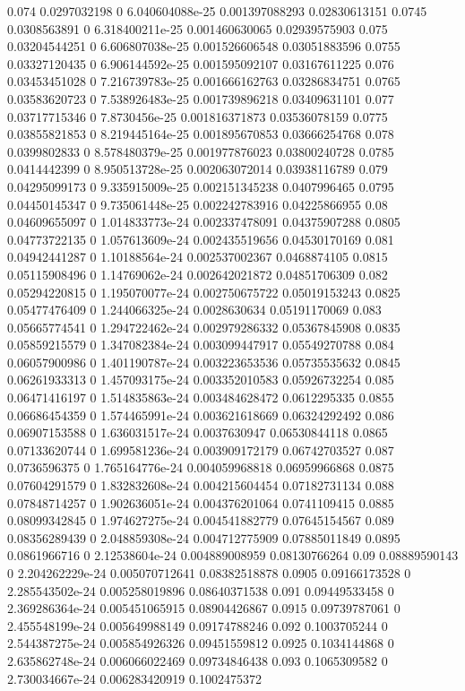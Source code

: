 {0.074 0.0297032198 0 6.040604088e-25 0.001397088293 0.02830613151
0.0745 0.0308563891 0 6.318400211e-25 0.001460630065 0.02939575903
0.075 0.03204544251 0 6.606807038e-25 0.001526606548 0.03051883596
0.0755 0.03327120435 0 6.906144592e-25 0.001595092107 0.03167611225
0.076 0.03453451028 0 7.216739783e-25 0.001666162763 0.03286834751
0.0765 0.03583620723 0 7.538926483e-25 0.001739896218 0.03409631101
0.077 0.03717715346 0 7.8730456e-25 0.001816371873 0.03536078159
0.0775 0.03855821853 0 8.219445164e-25 0.001895670853 0.03666254768
0.078 0.0399802833 0 8.578480379e-25 0.001977876023 0.03800240728
0.0785 0.0414442399 0 8.950513728e-25 0.002063072014 0.03938116789
0.079 0.04295099173 0 9.335915009e-25 0.002151345238 0.0407996465
0.0795 0.04450145347 0 9.735061448e-25 0.002242783916 0.04225866955
0.08 0.04609655097 0 1.014833773e-24 0.002337478091 0.04375907288
0.0805 0.04773722135 0 1.057613609e-24 0.002435519656 0.04530170169
0.081 0.04942441287 0 1.10188564e-24 0.002537002367 0.0468874105
0.0815 0.05115908496 0 1.14769062e-24 0.002642021872 0.04851706309
0.082 0.05294220815 0 1.195070077e-24 0.002750675722 0.05019153243
0.0825 0.05477476409 0 1.244066325e-24 0.0028630634 0.05191170069
0.083 0.05665774541 0 1.294722462e-24 0.002979286332 0.05367845908
0.0835 0.05859215579 0 1.347082384e-24 0.003099447917 0.05549270788
0.084 0.06057900986 0 1.401190787e-24 0.003223653536 0.05735535632
0.0845 0.06261933313 0 1.457093175e-24 0.003352010583 0.05926732254
0.085 0.06471416197 0 1.514835863e-24 0.003484628472 0.0612295335
0.0855 0.06686454359 0 1.574465991e-24 0.003621618669 0.06324292492
0.086 0.06907153588 0 1.636031517e-24 0.0037630947 0.06530844118
0.0865 0.07133620744 0 1.699581236e-24 0.003909172179 0.06742703527
0.087 0.0736596375 0 1.765164776e-24 0.004059968818 0.06959966868
0.0875 0.07604291579 0 1.832832608e-24 0.004215604454 0.07182731134
0.088 0.07848714257 0 1.902636051e-24 0.004376201064 0.0741109415
0.0885 0.08099342845 0 1.974627275e-24 0.004541882779 0.07645154567
0.089 0.08356289439 0 2.048859308e-24 0.004712775909 0.07885011849
0.0895 0.0861966716 0 2.12538604e-24 0.004889008959 0.08130766264
0.09 0.08889590143 0 2.204262229e-24 0.005070712641 0.08382518878
0.0905 0.09166173528 0 2.285543502e-24 0.005258019896 0.08640371538
0.091 0.09449533458 0 2.369286364e-24 0.005451065915 0.08904426867
0.0915 0.09739787061 0 2.455548199e-24 0.005649988149 0.09174788246
0.092 0.1003705244 0 2.544387275e-24 0.005854926326 0.09451559812
0.0925 0.1034144868 0 2.635862748e-24 0.006066022469 0.09734846438
0.093 0.1065309582 0 2.730034667e-24 0.006283420919 0.1002475372
}
